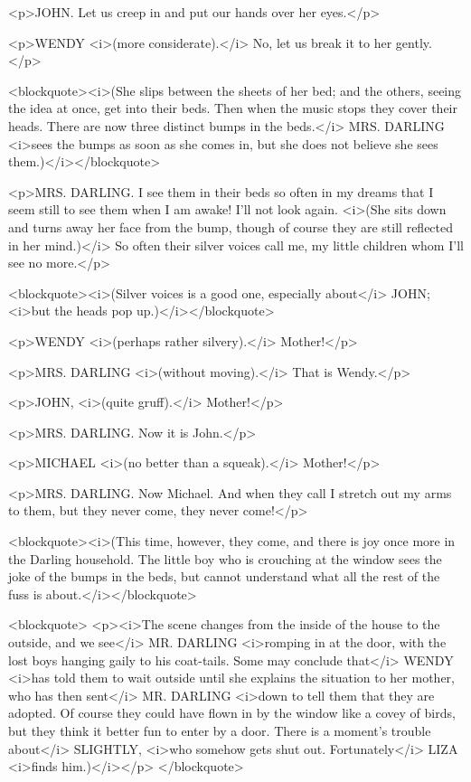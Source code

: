 <p>JOHN. Let us creep in and put our hands over her eyes.</p>

<p>WENDY <i>(more considerate).</i> No, let us break it to her gently.</p>

<blockquote><i>(She slips between the sheets of her bed; and the others, seeing the idea at once, get into their beds. Then when the music stops they cover their heads. There are now three distinct bumps in the beds.</i> MRS. DARLING <i>sees the bumps as soon as she comes in, but she does not believe she sees them.)</i></blockquote>

<p>MRS. DARLING. I see them in their beds so often in my dreams that I seem still to see them when I am awake! I'll not look again. <i>(She sits down and turns away her face from the bump, though of course they are still reflected in her mind.)</i> So often their silver voices call me, my little children whom I'll see no more.</p>

<blockquote><i>(Silver voices is a good one, especially about</i> JOHN; <i>but the heads pop up.)</i></blockquote>

<p>WENDY <i>(perhaps rather silvery).</i> Mother!</p>

<p>MRS. DARLING <i>(without moving).</i> That is Wendy.</p>

<p>JOHN, <i>(quite gruff).</i> Mother!</p>

<p>MRS. DARLING. Now it is John.</p>

<p>MICHAEL <i>(no better than a squeak).</i> Mother!</p>

<p>MRS. DARLING. Now Michael. And when they call I stretch out my arms to them, but they never come, they never come!</p>

<blockquote><i>(This time, however, they come, and there is joy once more in the Darling household. The little boy who is crouching at the window sees the joke of the bumps in the beds, but cannot understand what all the rest of the fuss is about.</i></blockquote>

<blockquote> <p><i>The scene changes from the inside of the house to the outside, and we see</i> MR. DARLING <i>romping in at the door, with the lost boys hanging gaily to his coat-tails. Some may conclude that</i> WENDY <i>has told them to wait outside until she explains the situation to her mother, who has then sent</i> MR. DARLING <i>down to tell them that they are adopted. Of course they could have flown in by the window like a covey of birds, but they think it better fun to enter by a door. There is a moment's trouble about</i> SLIGHTLY, <i>who somehow gets shut out. Fortunately</i> LIZA <i>finds him.)</i></p> </blockquote>

